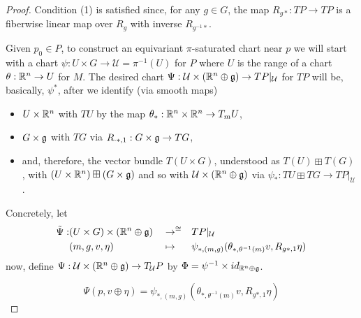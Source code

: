 \begin{proof}
Condition (1) is satisfied since, for any $g \in G$, the map $R_{g*}:TP \to TP$ is a fiberwise linear map over $R_g$ with inverse $R_{g^{-1} *}$.

Given $p_0 \in P$, to construct an equivariant $\pi$-saturated chart near $p$ we will start with a chart $\psi:U \times G \to \mathcal U = \pi^{-1}(U)$ for $P$ where $U$ is the range of a chart $\theta:\mathbb{R}^n \to U$ for $M$. The desired chart $\Psi: \mathcal U \times (\mathbb{R}^n \oplus \mathfrak{g}) \to TP|_{\mathcal U}$ for $TP$ will be, basically, $\psi^*$, after we identify (via smooth maps) 
    \begin{itemize}
    
    \item $U \times \mathbb{R}^n$ with $TU$ by the map $\theta_{*}: \mathbb{R}^n \times \mathbb{R}^n \to T_m U$,  
    
    \item $G \times \mathfrak{g}$ with $TG$ via $R_{\cdot *, 1}: G \times \mathfrak{g} \to T G$,
    
    \item and, therefore, the vector bundle $T(U \times G)$, understood as $T(U) \boxplus T(G)$, with $(U \times \mathbb{R}^n) \boxplus (G \times \mathfrak{g})$ and so with $\mathcal U \times (\mathbb{R}^n \oplus \mathfrak{g})$ via $\psi_*: TU \boxplus TG \to TP|_{\mathcal U}$.
    
    \end{itemize}

Concretely, let
\begin{align*}
    \Tilde \Psi :& (U \times G) \times (\mathbb{R}^n \oplus \mathfrak{g}) && \to^{\cong} && TP|_{\mathcal U} \\    
                 & (m, g, v, \eta)&& \mapsto &&\psi_{*, (m, g)}(\theta_{*, \theta^{-1}(m)} v, R_{g*, 1} \eta) 
\end{align*}
now, define $\Psi : \mathcal U \times (\mathbb{R}^n \oplus \mathfrak{g})  \to  T_{\mathcal U}P$ by $\Phi = \psi^{-1} \times id_{\mathbb{R}^n \oplus \mathfrak{g}}$. %

\[
    \Psi(p, v \oplus \eta) = \psi_{*, (m, g)}(\theta_{*, \theta^{-1}(m)} v, R_{g*, 1} \eta)
\]


\end{proof}
